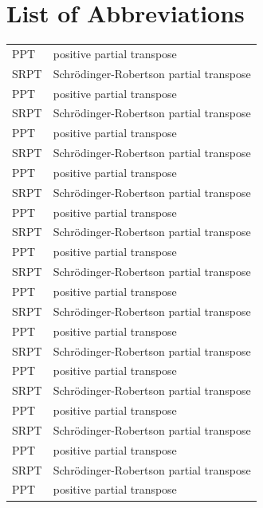 \chapter*{List of Abbreviations}

\setlength\LTleft{-5pt} %

\begin{longtable}{l p{}}
    PPT  & positive partial transpose                \\
    SRPT & Schr\"odinger-Robertson partial transpose \\
    PPT  & positive partial transpose                \\
    SRPT & Schr\"odinger-Robertson partial transpose \\
    PPT  & positive partial transpose                \\
    SRPT & Schr\"odinger-Robertson partial transpose \\
    PPT  & positive partial transpose                \\
    SRPT & Schr\"odinger-Robertson partial transpose \\
    PPT  & positive partial transpose                \\
    SRPT & Schr\"odinger-Robertson partial transpose \\
    PPT  & positive partial transpose                \\
    SRPT & Schr\"odinger-Robertson partial transpose \\
    PPT  & positive partial transpose                \\
    SRPT & Schr\"odinger-Robertson partial transpose \\
    PPT  & positive partial transpose                \\
    SRPT & Schr\"odinger-Robertson partial transpose \\
    PPT  & positive partial transpose                \\
    SRPT & Schr\"odinger-Robertson partial transpose \\
    PPT  & positive partial transpose                \\
    SRPT & Schr\"odinger-Robertson partial transpose \\
    PPT  & positive partial transpose                \\
    SRPT & Schr\"odinger-Robertson partial transpose \\
    PPT  & positive partial transpose                \\

\end{longtable}
